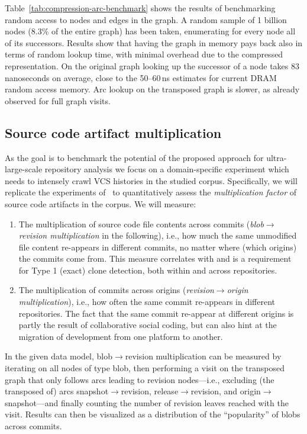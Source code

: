 Table~\ref{tab:compression-arc-benchmark} shows the results of benchmarking
random access to nodes and edges in the graph. A random sample of 1 billion
nodes (8.3\% of the entire graph) has been taken, enumerating for every node
all of its successors.  Results show that having the graph in memory pays back
also in terms of random lookup time, with minimal overhead due to the
compressed representation. On the original graph looking up the successor of a
node takes 83 nanoseconds on average, close to the 50--60\,ns estimates for
current DRAM random access memory. Arc lookup on the transposed graph is
slower, as already observed for full graph visits.


\subsection{Source code artifact multiplication}%
\label{sec:compression-expmultiplication}

As the goal is to benchmark the potential of the proposed approach for
ultra-large-scale repository analysis we focus on a domain-specific experiment
which needs to intensely crawl VCS histories in the studied corpus.
Specifically, we will replicate the experiments of~\cite{swh-provenance-tr} to
quantitatively assess the \emph{multiplication factor} of source code artifacts
in the corpus. We will measure:
\begin{enumerate}

\item The multiplication of source code file contents across commits
  (\emph{blob$\to$revision multiplication} in the following), i.e., how much
  the same unmodified file content re-appears in different commits, no matter
  where (which origins) the commits come from. This measure correlates with and
  is a requirement for Type 1 (exact) clone detection, both within and across
  repositories.

\item The multiplication of commits across origins (\emph{revision$\to$origin
    multiplication}), i.e., how often the same commit re-appears in different
  repositories. The fact that the same commit re-appear at different origins is
  partly the result of collaborative social coding, but can also hint at the
  migration of development from one platform to another.

\end{enumerate}

In the given data model, blob$\to$revision multiplication can be measured by
iterating on all nodes of type blob, then performing a visit on the
transposed graph that only follows arcs leading to revision nodes---i.e.,
excluding (the transposed of) arcs snapshot$\to$revision, release$\to$revision,
and origin$\to$ snapshot---and finally counting the number of revision leaves
reached with the visit. Results can then be visualized as a distribution of the
``popularity'' of blobs across commits.


